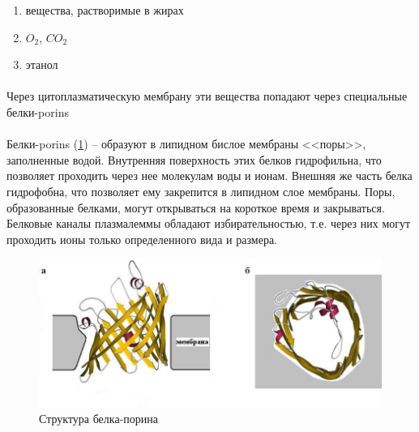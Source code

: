 \begin{enumerate}
	\item вещества, растворимые в жирах
	\item $O_{2}$, $CO_{2}$
	\item этанол
\end{enumerate}

\paragraph*{}Через цитоплазматическую мембрану эти вещества попадают через специальные белки-\gls{porins}
 

\paragraph*{}Белки-\gls{porins} (\ris \ref{porin}) -- образуют в липидном бислое мембраны <<поры>>, заполненные водой. Внутренняя поверхность этих белков гидрофильна, что позволяет проходить через нее молекулам воды и ионам. Внешняя же часть белка гидрофобна, что позволяет ему закрепится в липидном слое мембраны. Поры, образованные белками, могут открываться на короткое время и закрываться. Белковые каналы плазмалеммы обладают избирательностью, т.е. через них могут проходить ионы только определенного вида и размера.

\begin{figure}[h!]
  \centering
       \includegraphics[width=0.5\linewidth]{pictures/porin}
\caption{Структура белка-порина}
\label{porin}
\end{figure}


